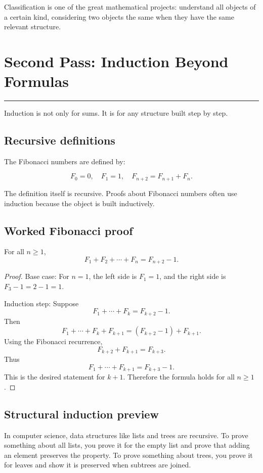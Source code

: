 \documentclass[12pt]{article}
\newcommand{\chapterline}{\vspace{0.4em}\hrule\vspace{0.8em}}
\begin{document}
Classification is one of the great mathematical projects: understand all objects of a certain kind, considering two objects the same when they have the same relevant structure.

\newpage
\section{Second Pass: Induction Beyond Formulas}
\chapterline

Induction is not only for sums. It is for any structure built step by step.

\subsection{Recursive definitions}

The Fibonacci numbers are defined by:

\[
F_0=0,\quad F_1=1,\quad F_{n+2}=F_{n+1}+F_n.
\]

The definition itself is recursive. Proofs about Fibonacci numbers often use induction because the object is built inductively.

\subsection{Worked Fibonacci proof}

\begin{theorem}
For all $n\geq1$,
\[
F_1+F_2+\cdots+F_n=F_{n+2}-1.
\]
\end{theorem}

\begin{proof}
Base case: For $n=1$, the left side is $F_1=1$, and the right side is $F_3-1=2-1=1$.

Induction step: Suppose
\[
F_1+\cdots+F_k=F_{k+2}-1.
\]
Then
\[
F_1+\cdots+F_k+F_{k+1}=(F_{k+2}-1)+F_{k+1}.
\]
Using the Fibonacci recurrence,
\[
F_{k+2}+F_{k+1}=F_{k+3}.
\]
Thus
\[
F_1+\cdots+F_{k+1}=F_{k+3}-1.
\]
This is the desired statement for $k+1$. Therefore the formula holds for all $n\geq1$.
\end{proof}

\subsection{Structural induction preview}

In computer science, data structures like lists and trees are recursive. To prove something about all lists, you prove it for the empty list and prove that adding an element preserves the property. To prove something about trees, you prove it for leaves and show it is preserved when subtrees are joined.
\end{document}
